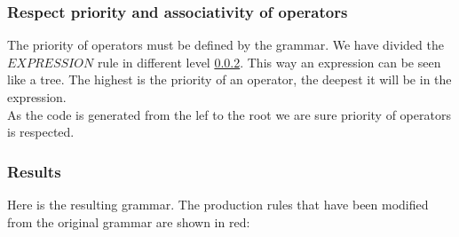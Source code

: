 \subsubsection{Respect priority and associativity of operators}

The priority of operators must be defined by the grammar. We have divided the $EXPRESSION$ rule in different level \ref{expression}. This way an expression can be seen like a tree. The highest is the priority of an operator, the deepest it will be in the expression.\\ As the code is generated from the lef to the root we are sure priority of operators is respected.  



\subsubsection{Results}
\label{expression}
Here is the resulting grammar. The production rules that have been modified from the original grammar are shown in red:



